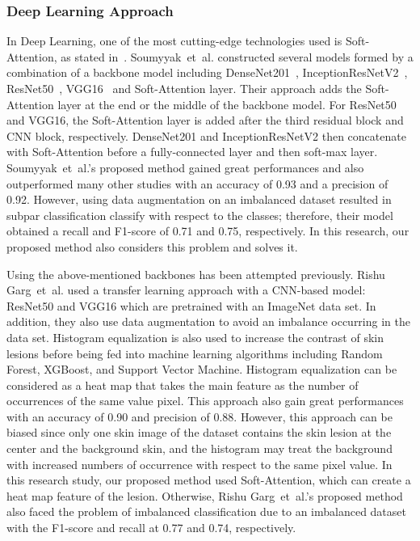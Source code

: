\documentclass[sensors,article,accept,pdftex,moreauthors]{Definitions/mdpi}
\begin{document}
{		\subsubsection{Deep Learning Approach}
		In Deep Learning, one of the most cutting-edge technologies  used is Soft-Attention, as stated in~\mbox{\cite{03358}}. Soumyyak~et~al. constructed several models formed by a combination of a backbone model including DenseNet201~\mbox{\cite{06993}}, InceptionResNetV2~\mbox{\cite{00567}}, ResNet50~\mbox{\cite{03385,05027}}, VGG16~\mbox{\cite{1556}} and Soft-Attention layer. Their approach adds the Soft-Attention layer at the end or the middle of the backbone model. For ResNet50 and VGG16, the Soft-Attention layer is added after the third residual block and CNN block, respectively. DenseNet201 and InceptionResNetV2 then concatenate with  Soft-Attention before a fully-connected layer and then soft-max layer. Soumyyak~et~al.'s proposed method gained great performances and also outperformed many other studies with an accuracy of 0.93 and a precision of 0.92. However, using  data augmentation on an imbalanced dataset resulted in subpar classification  classify with respect to the  classes; therefore, their model obtained a  recall and F1-score of 0.71 and 0.75, respectively. In this research, our proposed method also considers this problem and solves it.
		
		Using the above-mentioned backbones has been attempted previously. Rishu Garg~et~al. \mbox{\cite{03798}} used a transfer learning approach with a CNN-based model: ResNet50 and VGG16 which are pretrained with an ImageNet data set. In addition, they also use data augmentation to avoid an imbalance occurring in  the data set. Histogram equalization is also used to increase the contrast of  skin lesions before being fed into machine learning algorithms including Random Forest, XGBoost, and Support Vector Machine. Histogram equalization can be considered as a heat map that takes the main feature as the number of occurrences of the same value pixel. This approach also gain great performances with an accuracy of 0.90 and  precision of 0.88. However, this approach can be biased since only one skin image of the dataset contains the skin lesion at the center and the background skin, and the histogram may treat the background with increased numbers of occurrence with respect to the same pixel value. In this research study, our proposed method used  Soft-Attention, which can create a heat map feature of the lesion. Otherwise, Rishu Garg~et~al.'s proposed method also faced the problem of imbalanced classification due to an imbalanced dataset with the F1-score and recall at 0.77 and 0.74, respectively.
		
}
\end{document}

